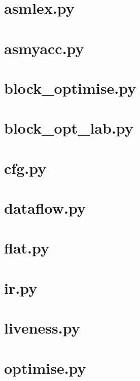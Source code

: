 \lstset{ %
language=Python,                %
}


\section{asmlex.py}


\section{asmyacc.py}


\section{block\_optimise.py}


\section{block\_opt\_lab.py}


\section{cfg.py}


\section{dataflow.py}


\section{flat.py}


\section{ir.py}


\section{liveness.py}


\section{optimise.py}


